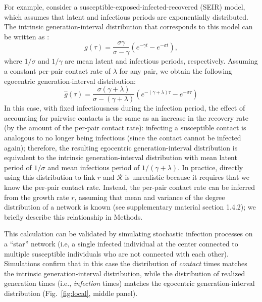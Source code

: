 \documentclass[12pt]{article}
\newcommand{\fref}[1]{Fig.~\ref{fig:#1}}
\newcommand{\RR}{\ensuremath{{\mathcal R}}}
\begin{document}
For example, consider a susceptible-exposed-infected-recovered (SEIR) model, which assumes that latent and infectious periods are exponentially distributed.
The intrinsic generation-interval distribution that corresponds to this model can be written as \citep{Champredon2018equivalence}:
\begin{equation}
g(\tau) = \frac{\sigma \gamma}{\sigma - \gamma} \left(e^{-\gamma t} - e^{-\sigma t}\right),
\end{equation}
where $1/\sigma$ and $1/\gamma$ are mean latent and infectious periods, respectively.
Assuming a constant per-pair contact rate of $\lambda$ for any pair, we obtain the following egocentric generation-interval distribution:
\begin{equation}
\hat{g}(\tau) = \frac{\sigma (\gamma + \lambda)}{\sigma - (\gamma + \lambda)} \left(e^{-(\gamma + \lambda)\tau} - e^{-\sigma \tau}\right)
\end{equation}
In this case, with fixed infectiousness during the infection period, the effect of accounting for pairwise contacts is the same as an increase in the recovery rate (by the amount of the per-pair contact rate): infecting a susceptible contact is analogous to no longer being infectious (since the contact cannot be infected again); therefore, the resulting egocentric generation-interval distribution is equivalent to the intrinsic generation-interval distribution with mean latent period of $1/\sigma$ and mean infectious period of $1/(\gamma + \lambda)$.
In practice, directly using this distribution to link $r$ and $\RR$ is unrealistic because it requires that we know the per-pair contact rate. 
Instead, the per-pair contact rate can be inferred from the growth rate $r$, assuming that mean and variance of the degree distribution of a network is known (see \cite{trapman2016inferring} supplementary material section 1.4.2);
we briefly describe this relationship in Methods.

This calculation can be validated by simulating stochastic infection processes on a ``star'' network (i.e, a single infected individual at the center connected to multiple susceptible individuals who are not connected with each other).
Simulations confirm that in this case the distribution of \emph{contact} times matches the intrinsic generation-interval distribution, while the distribution of realized generation times (i.e., \emph{infection} times) matches the egocentric generation-interval distribution (\fref{local}, middle panel).
\end{document}

